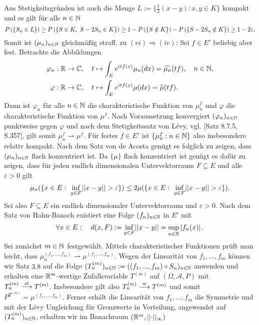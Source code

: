 \begin{proof*}
    Aus Stetigkeitsgründen ist auch die Menge $L := \{\frac{1}{2}(x-y): x,y \in K\}$ kompakt und es gilt für alle $n \in \mathbb{N}$
    $$
        \prob{S_n \in L} \geq \prob{S \in K, \ S-2S_n \in K} \geq 1 - \prob{S \notin K} - \prob{S-2S_n \notin K} \geq 1 - 2\varepsilon. 
    $$ 
    Somit ist $(\mu_n)_{n \in \mathbb{N}}$ gleichmäßig straff. 
    \newline
    zu $(vi) \Rightarrow (iv)$: 
    Sei $f \in E'$ beliebig aber fest. Betrachte die Abbildungen 
    \begin{align*}
        \varphi_n &: \mathbb{R} \to \mathbb{C}, \quad t \mapsto \int_E e^{itf(x)}\mu_n(dx) = \widehat{\mu_n}(tf), \quad n \in \mathbb{N}, \\\
        \varphi   &: \mathbb{R} \to \mathbb{C}, \quad t \mapsto \int_E e^{itf(x)}\mu(dx) = \widehat{\mu}(tf). 
    \end{align*}
    Dann ist $\varphi_n$ für alle $n \in \mathbb{N}$ die charakteristische Funktion von $\mu_n^{f}$ und $\varphi$ die charakteristische Funktion von $\mu^f$. Nach Voraussetzung konvergiert $(\varphi_n)_{n \in \mathbb{N}}$ punktweise gegen $\varphi$ und nach 
    dem Stetigkeitssatz von Lévy, vgl. \cite{gs}[Satz 8.7.5, S.357], gilt somit $\mu_n^f \rightharpoonup \mu^f$. Für festes $f \in E'$ ist $\{\mu_n^f : n \in \mathbb{N}\}$ also insbesondere relativ kompakt. Nach dem Satz von de Acosta genügt es folglich zu zeigen, dass $(\mu_n)_{n \in \mathbb{N}}$ flach konzentriert ist. 
    Da $\{\mu\}$ flach konzentriert ist genügt es dafür zu zeigen, dass für jeden endlich dimensionalen Untervektorraum $F \subseteq E$ und alle $\varepsilon > 0$ gilt 
    $$
        \mu_n(\{x \in E: \ \inf_{y \in F}\lvert\lvert x-y \rvert\rvert > \varepsilon \}) \leq 2 \mu(\{x \in E: \ \inf_{y \in F}\lvert\lvert x-y \rvert\rvert > \varepsilon \}).
    $$
    Sei also $F \subseteq E$ ein endlich dimensionaler Untervektorraum und $\varepsilon >0$. Nach dem Satz von Hahn-Banach existiert eine Folge $(f_n)_{n \in \mathbb{N}}$ in $E'$ mit 
    $$
        \forall x \in E: \quad d(x,F) := \inf_{y \in F}\lvert\lvert x-y \rvert\rvert = \sup_{n \in \mathbb{N}}\left| f_n(x) \right|. 
    $$
    Sei zunächst $m \in \mathbb{N}$ festgewählt. Mittels charakteristischer Funktionen prüft man leicht, dass $\mu_n^{(f_1,...,f_m)} \rightharpoonup \mu^{(f_1,...,f_m)}$. 
    Wegen der Linearität von $f_1,...,f_m$ können wir Satz $3.8$ auf die Folge $(T_n^{(m)})_{n \in \mathbb{N}} := ((f_1,...,f_m)\circ S_n)_{n \in \mathbb{N}}$ anwenden und erhalten eine $\mathbb{R}^m$-wertige Zufallsvariable $T^{(m)}$ auf $(\Omega, \mathcal{A}, P)$ mit 
    $T_n^{(m)} \overset{st}{\longrightarrow} T^{(m)}$. Insbesondere gilt also $T_n^{(m)} \overset{w}{\longrightarrow} T^{(m)}$ und somit \mbox{$P^{T^{(m)}} = \mu^{(f_1,...,f_m)}$}. 
    Ferner erhält die Linearität von $f_1,...,f_m$ die Symmetrie und mit der Lévy Ungleichung für Grenzwerte in Verteilung, angewendet auf $(T_n^{(m)})_{n \in \mathbb{N}}$, erhalten wir im Banachraum $(\mathbb{R}^m, \lvert\lvert \cdot \rvert\rvert_{\infty})$

\end{proof*}
